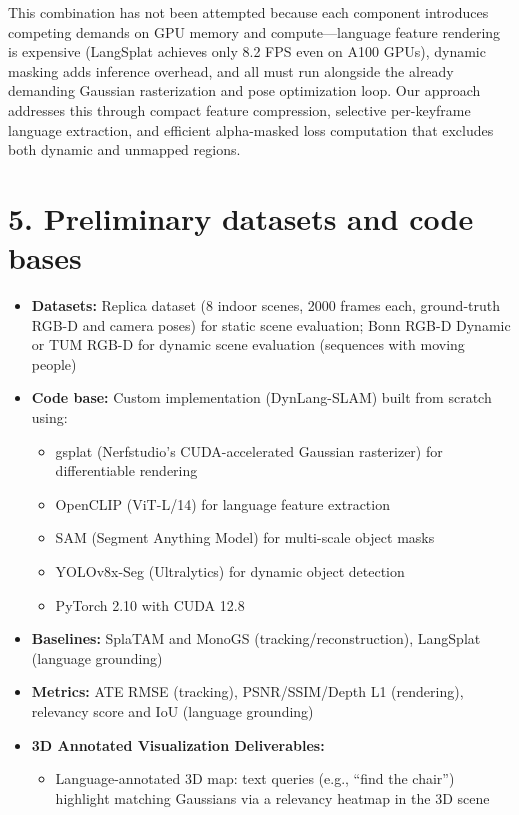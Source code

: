 \documentclass[11pt,letterpaper]{article}
\begin{document}
This combination has not been attempted because each component introduces competing demands on GPU memory and compute---language feature rendering is expensive (LangSplat achieves only 8.2 FPS even on A100 GPUs), dynamic masking adds inference overhead, and all must run alongside the already demanding Gaussian rasterization and pose optimization loop. Our approach addresses this through compact feature compression, selective per-keyframe language extraction, and efficient alpha-masked loss computation that excludes both dynamic and unmapped regions.

\section*{5. Preliminary datasets and code bases}

\begin{itemize}[nosep]
    \item \textbf{Datasets:} Replica dataset (8 indoor scenes, 2000 frames each, ground-truth RGB-D and camera poses) for static scene evaluation; Bonn RGB-D Dynamic or TUM RGB-D for dynamic scene evaluation (sequences with moving people)
    \item \textbf{Code base:} Custom implementation (DynLang-SLAM) built from scratch using:
    \begin{itemize}[nosep]
        \item gsplat (Nerfstudio's CUDA-accelerated Gaussian rasterizer) for differentiable rendering
        \item OpenCLIP (ViT-L/14) for language feature extraction
        \item SAM (Segment Anything Model) for multi-scale object masks
        \item YOLOv8x-Seg (Ultralytics) for dynamic object detection
        \item PyTorch 2.10 with CUDA 12.8
    \end{itemize}
    \item \textbf{Baselines:} SplaTAM and MonoGS (tracking/reconstruction), LangSplat (language grounding)
    \item \textbf{Metrics:} ATE RMSE (tracking), PSNR/SSIM/Depth L1 (rendering), relevancy score and IoU (language grounding)
    \item \textbf{3D Annotated Visualization Deliverables:}
    \begin{itemize}[nosep]
        \item Language-annotated 3D map: text queries (e.g., ``find the chair'') highlight matching Gaussians via a relevancy heatmap in the 3D scene

\end{itemize}
\end{itemize}
\end{document}
